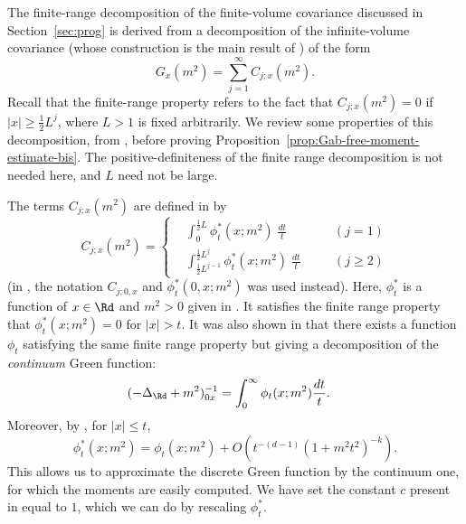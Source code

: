 The finite-range decomposition of the finite-volume covariance discussed in
Section~\ref{sec:prog} is derived from a decomposition of the infinite-volume
covariance (whose construction is the main result of \cite{Baue13a}) of the form
\begin{equation}
    G_x(m^2) = \sum_{j=1}^\infty C_{j;x}(m^2).
\end{equation}
Recall that the finite-range property refers to the fact that $C_{j;x}(m^2) = 0$ if
$|x| \ge \frac 12 L^j$,
where $L>1$ is fixed arbitrarily.
 We review some properties of this decomposition, from
\cite{BBS-rg-pt,Baue13a}, before
proving Proposition~\ref{prop:Gab-free-moment-estimate-bis}.
The positive-definiteness of the finite range
decomposition is not needed here, and $L$ need not be large.

The terms $C_{j;x}(m^2)$ are defined in \cite[Section~\ref{pt-sec:Cdecomp}]{BBS-rg-pt} by
\begin{equation} \label{e:Cdef}
  C_{j;x}(m^2) = \left\{\begin{aligned}
      &\int_{0}^{\frac{1}{2} L}  \phi_{t}^*(x; m^2) \; \frac{dt}{t}
      &\quad& (j=1)
      \\
      &\int_{\frac{1}{2} L^{j-1}}^{\frac{1}{2} L^{j}}  \phi_{t}^*(x; m^2) \; \frac{dt}{t}
      && (j\ge 2)
    \end{aligned}\right.
\end{equation}
(in \cite{BBS-rg-pt}, the notation $C_{j;0,x}$ and $\phi^*_t(0, x; m^2)$ was used instead).
Here, $\phi_t^*$ is a function of $x \in \Rd$ and $m^2 > 0$ given in
\cite[Example 1.1]{Baue13a}. It satisfies the finite range property that
$\phi_t^*(x; m^2) = 0$ for $|x| > t$.
It was also shown in \cite{Baue13a} that there exists a function $\phi_t$
satisfying the same finite range property but giving a decomposition of the
\emph{continuum} Green function:
\begin{align}
\label{e:frd-cont-int}
    (-\Delta_{\Rd} + m^2)^{-1}_{0x}
    &=
    \int_0^\infty \phi_t(x; m^2) \frac{dt}{t} .
\end{align}
Moreover, by \cite[(1.37)]{Baue13a}, for $|x| \leq t$,
\begin{equation}
\label{e:frd-Zd-Rd}
\phi^*_t(x; m^2) = \phi_t(x; m^2) + O(t^{-(d-1)} (1 + m^2 t^2)^{-k}).
\end{equation}
This allows us to approximate the discrete Green function by the continuum one, for which the moments are easily computed.
We have set the constant $c$ present in \cite{Baue13a} equal to $1$, which we can do by rescaling $\phi_t^*$.

